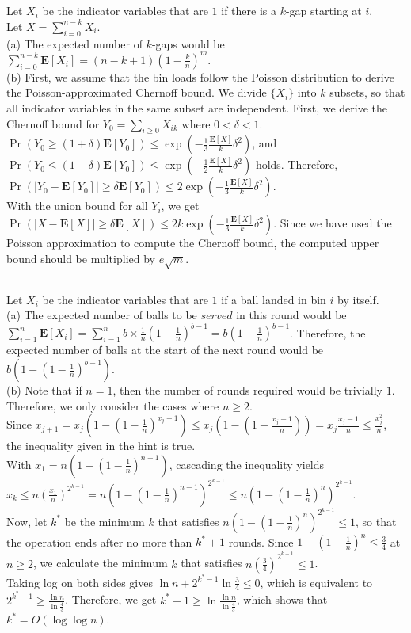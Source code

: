 \documentclass{article}
\begin{document}
\subsection{}
Let $X_i$ be the indicator variables that are $1$ if there is a $k$-gap starting at $i$.\\
Let $X=\sum\limits_{i=0}^{n-k}X_i$.\\
(a) The expected number of $k$-gaps would be $\sum\limits_{i=0}^{n-k}\textbf{E}[X_i]=(n-k+1)(1-\frac{k}{n})^m$.\\
(b) First, we assume that the bin loads follow the Poisson distribution to derive the Poisson-approximated Chernoff bound.
We divide $\{X_i\}$ into $k$ subsets, so that all indicator variables in the same subset are independent.
First, we derive the Chernoff bound for $Y_0=\sum\limits_{i\geq0}X_{ik}$ where $0<\delta<1$.\\
$\Pr(Y_0\geq(1+\delta)\textbf{E}[Y_0])\leq\exp(-\frac{1}{3}\frac{\textbf{E}[X]}{k}\delta^2)$, and
$\Pr(Y_0\leq(1-\delta)\textbf{E}[Y_0])\leq\exp(-\frac{1}{2}\frac{\textbf{E}[X]}{k}\delta^2)$ holds.
Therefore, $\Pr(|Y_0-\textbf{E}[Y_0]|\geq\delta\textbf{E}[Y_0])\leq2\exp(-\frac{1}{3}\frac{\textbf{E}[X]}{k}\delta^2)$.\\
With the union bound for all $Y_i$, we get $\Pr(|X-\textbf{E}[X]|\geq\delta\textbf{E}[X])\leq2k\exp(-\frac{1}{3}\frac{\textbf{E}[X]}{k}\delta^2)$.
Since we have used the Poisson approximation to compute the Chernoff bound, the computed upper bound should be multiplied by $e\sqrt{m}$.
\subsection{}
Let $X_i$ be the indicator variables that are $1$ if a ball landed in bin $i$ by itself.\\
(a) The expected number of balls to be $\textit{served}$ in this round would be
$\sum\limits_{i=1}^n\textbf{E}[X_i]=\sum\limits_{i=1}^nb\times\frac{1}{n}(1-\frac{1}{n})^{b-1}=b(1-\frac{1}{n})^{b-1}$.
Therefore, the expected number of balls at the start of the next round would be $b(1-(1-\frac{1}{n})^{b-1})$.\\
(b) Note that if $n=1$, then the number of rounds required would be trivially $1$. Therefore, we only consider the cases where $n\geq 2$.\\
Since $x_{j+1}=x_j(1-(1-\frac{1}{n})^{x_j-1})\leq x_j(1-(1-\frac{x_j-1}{n}))=x_j\frac{x_j-1}{n}\leq \frac{x_j^2}{n}$, the inequality given in the hint is true.\\
With $x_1=n(1-(1-\frac{1}{n})^{n-1})$, cascading the inequality yields $x_k\leq n(\frac{x_1}{n})^{2^{k-1}}=n(1-(1-\frac{1}{n})^{n-1})^{2^{k-1}}\leq n(1-(1-\frac{1}{n})^n)^{2^{k-1}}$.\\
Now, let $k^*$ be the minimum $k$ that satisfies $n(1-(1-\frac{1}{n})^n)^{2^{k-1}}\leq 1$, so that the operation ends after no more than $k^*+1$ rounds.
Since $1-(1-\frac{1}{n})^n \leq \frac{3}{4}$ at $n\geq 2$, we calculate the minimum $k$ that satisfies $n(\frac{3}{4})^{2^{k-1}}\leq 1$.\\
Taking log on both sides gives $\ln n +2^{k^*-1} \ln\frac{3}{4}\leq 0$, which is equivalent to $2^{k^*-1}\geq \frac{\ln n}{\ln \frac{4}{3}}$.
Therefore, we get $k^*-1\geq \ln \frac{\ln n}{\ln \frac{4}{3}}$, which shows that $k^*=O(\log\log n)$.
\end{document}

